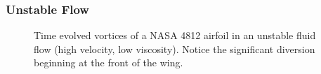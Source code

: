 \documentclass[twoside]{article}
\begin{document}
\subsubsection{Unstable Flow}

\begin{centering}
\begin{figure}[H]
\centering
\graphicspath{ {stream_images/} }
\hfill
{}
\hfill
{}
\label{figs:UnstableAirfoil}
\captionsetup{format = hang, width = 0.8\textwidth}
\caption{Time evolved vortices of a NASA 4812 airfoil in an unstable fluid flow (high velocity, low viscosity). Notice the significant diversion beginning at the front of the wing.}
\end{figure}
\end{centering}






\newpage





\end{document}

